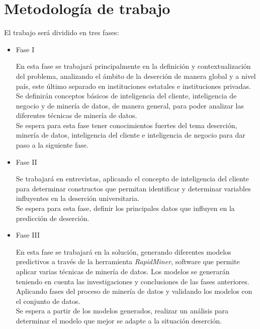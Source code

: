 \section{Metodología de trabajo}

El trabajo será dividido en tres fases:

\begin{itemize}
    \item Fase I
    
   En esta fase se trabajará principalmente en la definición y contextualización del problema, analizando el ámbito de la deserción de manera global y a nivel país, este último separado en instituciones estatales e instituciones privadas. Se definirán conceptos básicos de inteligencia del cliente, inteligencia de negocio y de minería de datos, de manera general, para poder analizar las diferentes técnicas de minería de datos. \\
    
    Se espera para esta fase tener conocimientos fuertes del tema deserción, minería de datos, inteligencia del cliente e inteligencia de negocio para dar paso a la siguiente fase.\\
    
    \item Fase II
    
    Se trabajará en entrevistas, aplicando el concepto de inteligencia del cliente para determinar constructos que permitan identificar y determinar variables influyentes en la deserción universitaria.\\   
    
    Se espera para esta fase, definir los principales datos que influyen en la predicción de deserción.\\
    
    \item Fase III
    
    En esta fase se trabajará en la solución, generando diferentes modelos predictivos a través de la herramienta \textit{RapidMiner}, software que permite aplicar varias técnicas de minería de datos. Los modelos se generarán teniendo en cuenta las investigaciones y conclusiones de las fases anteriores. Aplicando fases del proceso de minería de datos y validando los modelos con el conjunto de datos.\\
    
    Se espera a partir de los modelos generados, realizar un análisis para determinar el modelo que mejor se adapte a la situación deserción.\\
    


\end{itemize}


